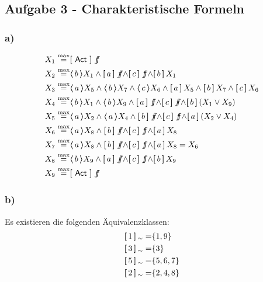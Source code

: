 \subsection*{Aufgabe 3 - Charakteristische Formeln}

\subsubsection*{a)}

\begin{align*}
X_1 \HMmax& \necess{ \Act } \false \\
X_2 \HMmax& \poss{b} X_1 \land \necess{a}\false \land \necess{c}\false \land \necess{b}X_1 \\
X_3 \HMmax& \poss{a}X_5 \land \poss{b}X_7 \land \poss{c}X_6 \land \necess{a}X_5 \land \necess{b}X_7 \land \necess{c}X_6 \\
X_4 \HMmax& \poss{b}X_1 \land \poss{b}X_9 \land \necess{a}\false \land \necess{c}\false \land \necess{b}(X_1 \lor X_9) \\
X_5 \HMmax& \poss{a}X_2 \land \poss{a}X_4 \land \necess{b}\false \land \necess{c}\false \land \necess{a}(X_2 \lor X_4) \\
X_6 \HMmax& \poss{a}X_8 \land \necess{b}\false \land \necess{c}\false \land \necess{a}X_8 \\
X_7 \HMmax& \poss{a}X_8 \land \necess{b}\false \land \necess{c}\false \land \necess{a}X_8 = X_6\\
X_8 \HMmax& \poss{b}X_9 \land \necess{a}\false \land \necess{c}\false \land \necess{b}X_9 \\
X_9 \HMmax& \necess{ \Act } \false \\
\end{align*}

\subsubsection*{b)}

Es existieren die folgenden Äquivalenzklassen: \\

\begin{align*}
\boldsymbol{[} \, 1 \, \boldsymbol{]}\,_\sim =& \{ 1, 9\} \\
\boldsymbol{[} \, 3 \, \boldsymbol{]}\,_\sim =& \{ 3\} \\
\boldsymbol{[} \, 5 \, \boldsymbol{]}\,_\sim =& \{ 5, 6, 7\} \\
\boldsymbol{[} \, 2 \, \boldsymbol{]}\,_\sim =& \{ 2, 4, 8\} \\
\end{align*}
